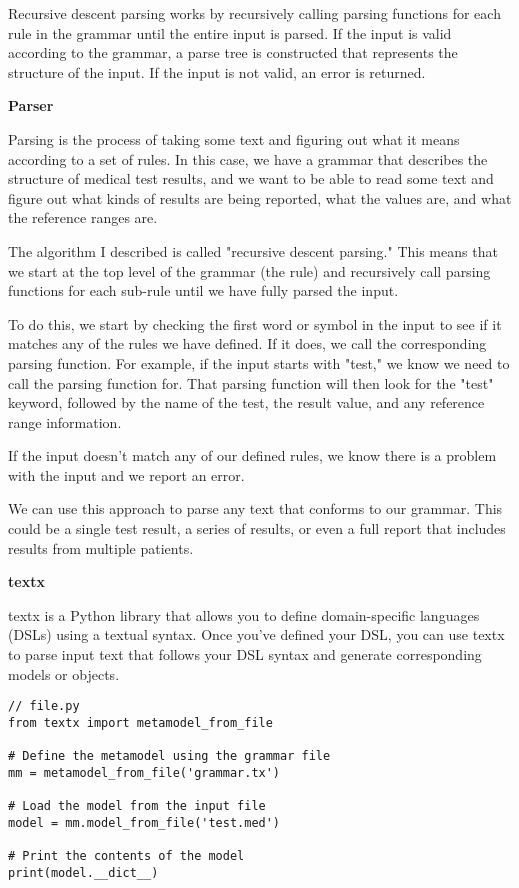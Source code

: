 Recursive descent parsing works by recursively calling parsing functions for each rule in the grammar until the entire input is parsed. If the input is valid according to the grammar, a parse tree is constructed that represents the structure of the input. If the input is not valid, an error is returned.

\textbf{Parser}

Parsing is the process of taking some text and figuring out what it means according to a set of rules. In this case, we have a grammar that describes the structure of medical test results, and we want to be able to read some text and figure out what kinds of results are being reported, what the values are, and what the reference ranges are.

The algorithm I described is called "recursive descent parsing." This means that we start at the top level of the grammar (the rule) and recursively call parsing functions for each sub-rule until we have fully parsed the input.

To do this, we start by checking the first word or symbol in the input to see if it matches any of the rules we have defined. If it does, we call the corresponding parsing function. For example, if the input starts with "test," we know we need to call the parsing function for. That parsing function will then look for the "test" keyword, followed by the name of the test, the result value, and any reference range information.

If the input doesn't match any of our defined rules, we know there is a problem with the input and we report an error.

We can use this approach to parse any text that conforms to our grammar. This could be a single test result, a series of results, or even a full report that includes results from multiple patients.

\textbf{textx}

textx is a Python library that allows you to define domain-specific languages (DSLs) using a textual syntax. Once you've defined your DSL, you can use textx to parse input text that follows your DSL syntax and generate corresponding models or objects.

\begin{lstlisting}
// file.py
from textx import metamodel_from_file

# Define the metamodel using the grammar file
mm = metamodel_from_file('grammar.tx')

# Load the model from the input file
model = mm.model_from_file('test.med')

# Print the contents of the model
print(model.__dict__)
\end{lstlisting}

